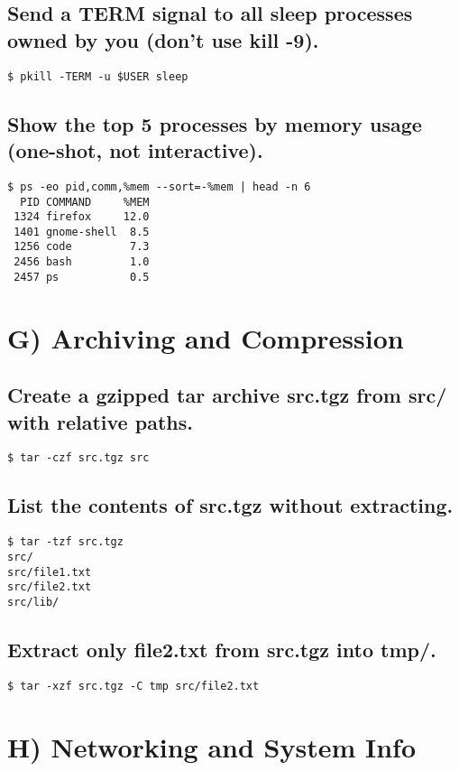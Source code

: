 \subsection{Send a TERM signal to all sleep processes owned by you (don’t use kill -9).}
\begin{verbatim}
$ pkill -TERM -u $USER sleep
\end{verbatim}

\subsection{Show the top 5 processes by memory usage (one-shot, not interactive).}
\begin{verbatim}
$ ps -eo pid,comm,%mem --sort=-%mem | head -n 6
  PID COMMAND     %MEM
 1324 firefox     12.0
 1401 gnome-shell  8.5
 1256 code         7.3
 2456 bash         1.0
 2457 ps           0.5
\end{verbatim}

\section{ G) Archiving and Compression}
\subsection{Create a gzipped tar archive src.tgz from src/ with relative paths.}
\begin{verbatim}
$ tar -czf src.tgz src
\end{verbatim}

\subsection{List the contents of src.tgz without extracting.}
\begin{verbatim}
$ tar -tzf src.tgz
src/
src/file1.txt
src/file2.txt
src/lib/
\end{verbatim}

\subsection{Extract only file2.txt from src.tgz into tmp/.}
\begin{verbatim}
$ tar -xzf src.tgz -C tmp src/file2.txt
\end{verbatim}

\section{ H) Networking and System Info}
